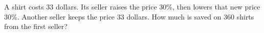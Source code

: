 A shirt costs 33 dollars. Its seller raises the price 30\%, then lowers that new price 30\%. Another seller keeps the price 33 dollars. How much is saved on 360 shirts from the first seller?
